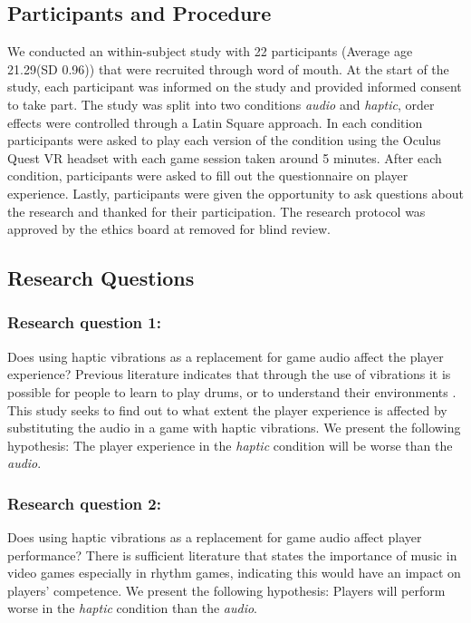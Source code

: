 \documentclass[manuscript,screen]{acmart}
\begin{document}
\subsection{Participants and Procedure}
We conducted an within-subject study with 22 participants (Average age 21.29(SD 0.96)) that were recruited through word of mouth. At the start of the study, each participant was informed on the study and provided informed consent to take part. The study was split into two conditions \textit{audio} and \textit{haptic}, order effects were controlled through a Latin Square approach. In each condition participants were asked to play each version of the condition using the Oculus Quest VR headset with each game session taken around 5 minutes. After each condition, participants were asked to fill out the questionnaire on player experience. Lastly, participants were given the opportunity to ask questions about the research and thanked for their participation. The research protocol was approved by the ethics board at removed for blind review. 

\subsection{Research Questions}
\subsubsection{Research question 1:} 
Does using haptic vibrations as a replacement for game audio affect the player experience? 
Previous literature indicates that through the use of vibrations it is possible for people to learn to play drums, or to understand their environments \cite{petry2018design}. This study seeks to find out to what extent the player experience is affected by substituting the audio in a game with haptic vibrations. We present the following hypothesis: The player experience in the \textit{haptic} condition will be worse than the \textit{audio}.

\subsubsection {Research question 2:}
Does using haptic vibrations as a replacement for game audio affect player performance? 
There is sufficient literature that states the importance of music in video games especially in rhythm games, \cite{peerdeman2010sound} indicating this would have an impact on players' competence. We present the following hypothesis: Players will perform worse in the \textit{haptic} condition than the \textit{audio}.
\end{document}
